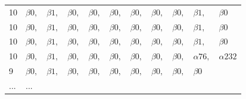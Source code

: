 \begin{frame}
\begin{table}
\begin{tabular}{|l|llllllllll|}
    \cellcolor{amarillo} 10 & \cellcolor{verde} $\beta0,$ & \cellcolor{verde} $\beta1,$ & \cellcolor{verde} $\beta0,$ & \cellcolor{verde} $\beta0,$ & \cellcolor{verde} $\beta0,$ & \cellcolor{verde} $\beta0,$ & \cellcolor{verde} $\beta0,$ & \cellcolor{verde} $\beta0,$ & \cellcolor{amarillo} $\beta1,$ & \cellcolor{amarillo} $\beta0$ \\
    \cellcolor{amarillo} 10 & \cellcolor{verde} $\beta0,$ & \cellcolor{verde} $\beta1,$ & \cellcolor{verde} $\beta0,$ & \cellcolor{verde} $\beta0,$ & \cellcolor{verde} $\beta0,$ & \cellcolor{verde} $\beta0,$ & \cellcolor{verde} $\beta0,$ & \cellcolor{verde} $\beta0,$ & \cellcolor{amarillo} $\beta1,$ & \cellcolor{amarillo} $\beta0$ \\
    \cellcolor{amarillo} 10 & \cellcolor{verde} $\beta0,$ & \cellcolor{verde} $\beta1,$ & \cellcolor{verde} $\beta0,$ & \cellcolor{verde} $\beta0,$ & \cellcolor{verde} $\beta0,$ & \cellcolor{verde} $\beta0,$ & \cellcolor{verde} $\beta0,$ & \cellcolor{verde} $\beta0,$ & \cellcolor{amarillo} $\beta1,$ & \cellcolor{amarillo} $\beta0$ \\
    \cellcolor{blanco} 10 &  \cellcolor{azul} $\beta0,$ & \cellcolor{azul} $\beta1,$ & \cellcolor{azul} $\beta0,$ & \cellcolor{azul} $\beta0,$ & \cellcolor{azul} $\beta0,$ & \cellcolor{azul} $\beta0,$ & \cellcolor{azul} $\beta0,$ & \cellcolor{azul} $\beta0,$  & \cellcolor{blanco} $\alpha76,$ & \cellcolor{blanco} $\alpha232$ \\
    \cellcolor{blanco} 9 &  \cellcolor{azul} $\beta0,$ & \cellcolor{azul} $\beta1,$ & \cellcolor{azul} $\beta0,$ & \cellcolor{azul} $\beta0,$ & \cellcolor{azul} $\beta0,$ & \cellcolor{azul} $\beta0,$ & \cellcolor{azul} $\beta0,$ & \cellcolor{azul} $\beta0,$  & \cellcolor{blanco} $\beta0$ & \\
	\cellcolor{blanco} ... & \multicolumn{9}{l}{\cellcolor{blanco} ...} & \\
\end{tabular}
\end{table} 

\end{frame}

